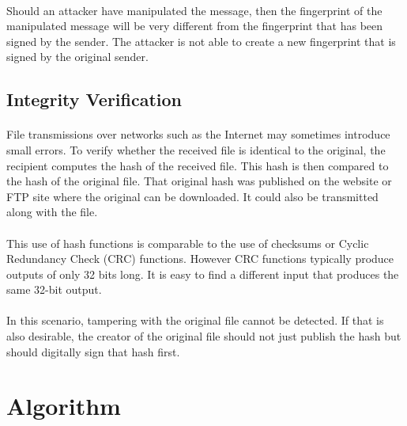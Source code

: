 \documentclass[a4paper,12pt]{article}
\begin{document}
		\paragraph{} Should an attacker have manipulated the message, then the fingerprint of the manipulated message will be very different from the fingerprint that has been signed by the sender. The attacker is not able to create a new fingerprint that is signed by the original sender.
	
	\subsection{Integrity Verification}
		\paragraph{} File transmissions over networks such as the Internet may sometimes introduce small errors. To verify whether the received file is identical to the original, the recipient computes the hash of the received file. This hash is then compared to the hash of the original file. That original hash was published on the website or FTP site where the original can be downloaded. It could also be transmitted along with the file.
		
		\paragraph{} This use of hash functions is comparable to the use of checksums or Cyclic Redundancy Check (CRC) functions. However CRC functions typically produce outputs of only 32 bits long. It is easy to find a different input that produces the same 32-bit output.
		
		\paragraph{} In this scenario, tampering with the original file cannot be detected. If that is also desirable, the creator of the original file should not just publish the hash but should digitally sign that hash first. 
		
\section{Algorithm}
\end{document}
